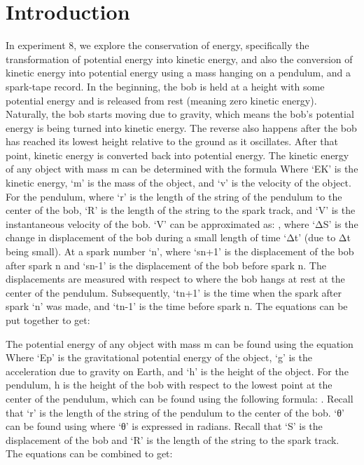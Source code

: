 \documentclass[letterpaper]{article}
\begin{document}
\section{Introduction}
In experiment 8, we explore the conservation of energy, specifically the transformation of potential energy into kinetic energy, and also the conversion of kinetic energy into potential energy using a mass hanging on a pendulum, and a spark-tape record. In the beginning, the bob is held at a height with some potential energy and is released from rest (meaning zero kinetic energy). Naturally, the bob starts moving due to gravity, which means the bob’s potential energy is being turned into kinetic energy. The reverse also happens after the bob has reached its lowest height relative to the ground as it oscillates. After that point, kinetic energy is converted back into potential energy.
The kinetic energy of any object with mass m can be determined with the formula
Where ‘EK’ is the kinetic energy, ‘m’ is the mass of the object, and ‘v’ is the velocity of the object.
For the pendulum,  where ‘r’ is the length of the string of the pendulum to the center of the bob, ‘R’ is the length of the string to the spark track, and ‘V’ is the instantaneous velocity of the bob. ‘V’ can be approximated as: , where ‘ΔS’ is the change in displacement of the bob during a small length of time ‘Δt’ (due to Δt being small). At a spark number ‘n’,  where ‘sn+1’ is the displacement of the bob after spark n and ‘sn-1’ is the displacement of the bob before spark n.  The displacements are measured with respect to where the bob hangs at rest at the center of the pendulum. Subsequently, ‘tn+1’ is the time when the spark after spark ‘n’ was made, and ‘tn-1’ is the time before spark n. The equations can be put together to get:



The potential energy of any object with mass m can be found using the equation
Where ‘Ep’ is the gravitational potential energy of the object, ‘g’ is the acceleration due to gravity on Earth, and ‘h’ is the height of the object. For the pendulum, h is the height of the bob with respect to the lowest point at the center of the pendulum, which can be found using the following formula:
. Recall that ‘r’ is the length of the string of the pendulum to the center of the bob. ‘θ’ can be found using  where ‘θ’ is expressed in radians. Recall that ‘S’ is the displacement of the bob and ‘R’ is the length of the string to the spark track.  The equations can be combined to get:
\end{document}
